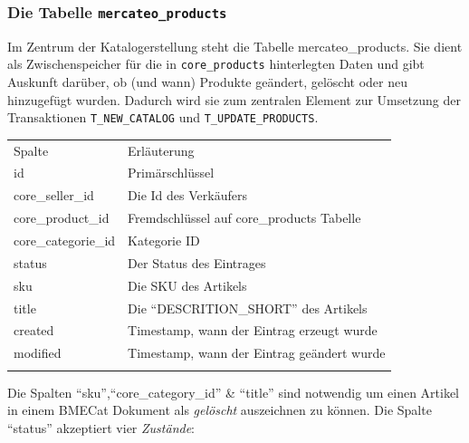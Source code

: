 	\subsubsection{Die Tabelle \texttt{mercateo\_products}}

	Im Zentrum der Katalogerstellung steht die Tabelle mercateo\_products. Sie dient als Zwischenspeicher für die in \texttt{core\_products} hinterlegten Daten und gibt Auskunft darüber, ob (und wann) Produkte geändert, gelöscht oder neu hinzugefügt wurden. Dadurch wird sie zum zentralen Element zur Umsetzung der Transaktionen \texttt{T\_NEW\_CATALOG} und \texttt{T\_UPDATE\_PRODUCTS}. 
	
	\begin{table}[!htbp]
		\begin{tabularx}{\textwidth}{p{4cm} X}
		\rowcolor[HTML]{EFEFEF} 
		Spalte & Erläuterung \\ \cline{1-2} \addlinespace[7pt]
		id & Primärschlüssel \\
		core\_seller\_id & Die Id des Verkäufers \\
		core\_product\_id & Fremdschlüssel auf core\_products Tabelle \\
		core\_categorie\_id & Kategorie ID  \\
		status & Der Status des Eintrages \\
		sku & Die SKU des Artikels \\
		title & Die \enquote{DESCRITION\_SHORT} des Artikels  \\ 
		created & Timestamp, wann der Eintrag erzeugt wurde  \\
		modified & Timestamp, wann der Eintrag geändert wurde  \\\addlinespace[7pt] \cline{1-2} 
		\end{tabularx}%
	\end{table}
	
	Die Spalten \enquote{sku},\enquote{core\_category\_id} \& \enquote{title} sind notwendig um einen Artikel in einem BMECat Dokument als \textit{gelöscht} auszeichnen zu können. Die Spalte \enquote{status} akzeptiert vier  \textit{Zustände}: 
	
